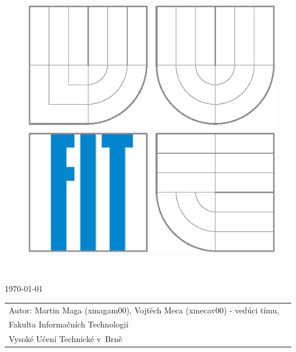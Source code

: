 \begin{titlepage}

\begin{figure}[!h]
  \centering
  \includegraphics[scale = 0.6]{img/logo.eps}
\end{figure}

\vfill

\begin{center}
\begin{Large}

\end{Large}
\bigskip
\begin{Huge}
\projname\\
\end{Huge}
\begin{large}

\end{large}
\end{center}

\vfill

\begin{center}
\begin{Large}
\today
\end{Large}
\end{center}

\vfill

\begin{flushleft}
\begin{large}
\begin{tabular}{ll}
Autor: Martin Maga (xmagam00), Vojtěch Meca (xmecav00) - vedúci tímu, \\              
  Fakulta Informačních Technologií \\
  Vysoké Učení Technické v~Brně \\
\end{tabular}
\end{large}
\end{flushleft}
\end{titlepage}
